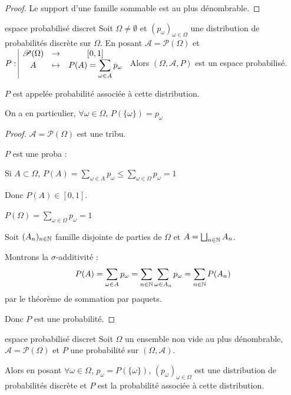 \begin{proof}
    Le support d'une famille sommable est au plus dénombrable.
\end{proof}

\begin{theoreme}{espace probabilisé discret}{}
    Soit $\Omega \neq \emptyset$ et $(p_\omega)_{\omega \in \Omega}$ une distribution de probabilités discrète
    sur $\Omega$. En posant $\mathcal A = \mathscr P(\Omega)$ et
    $P: \space \begin{array}{|ccc} \displaystyle \mathscr P(\Omega) & \to & \displaystyle [0, 1] \\ \displaystyle A & \mapsto & \displaystyle P(A) = \sum_{\omega \in A} p_\omega  \end{array}$
    Alors $(\Omega, \mathcal A, P)$ est un espace probabilisé.

    $P$ est appelée probabilité associée à cette distribution. 
\end{theoreme}

\begin{remarque}
    On a en particulier, $\forall \omega \in \Omega, \, P(\{\omega\}) = p_\omega$
\end{remarque}

\begin{proof}
    $\mathcal A = \mathscr P(\Omega)$ est une tribu.

    $P$ est une proba : 

    Si $A \subset \Omega$, $P(A) = \sum_{\omega \in A} p_\omega \leqslant \sum_{\omega \in \Omega} p_\omega = 1$

    Donc $P(A) \in [0, 1]$.

    $\displaystyle P(\Omega) = \sum_{\omega \in \Omega} p_\omega = 1$

    Soit $(A_n)_{n \in \mathbb{N}}$ famille disjointe de parties de $\Omega$ et $A = \bigsqcup_{n \in \mathbb{N}} A_n$.

    Montrons la $\sigma$-additivité :
    $$ P(A) = \sum_{\omega \in A} p_\omega = \sum_{n \in \mathbb{N}} \sum_{\omega \in A_n} p_\omega = \sum_{n \in \mathbb{N}} P(A_n) $$
    par le théorème de sommation par paquets.

    Donc $P$ est une probabilité.
\end{proof}

\begin{theorement}{espace probabilisé discret}{}
    Soit $\Omega$ un ensemble non vide au plus dénombrable,
    $\mathcal A = \mathscr P(\Omega)$ et $P$ une probabilité sur $(\Omega, \mathcal A)$.

    Alors en posant $\forall \omega \in \Omega, \, p_\omega = P(\{\omega\})$,
    $(p_\omega)_{\omega \in \Omega}$ est une distribution de probabilités discrète 
    et $P$ est la probabilité associée à cette distribution.
\end{theorement}

